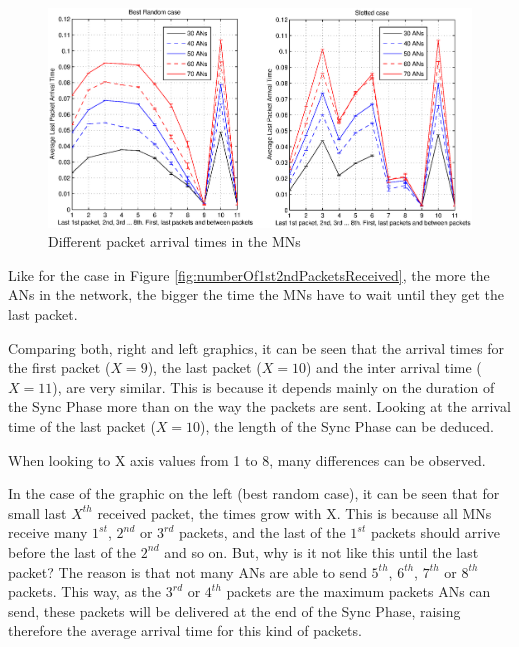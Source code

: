 \begin{figure}[ht]
 \begin{center}
  \includegraphics[width=1\textwidth]{Lastarrivalpackettimes.eps}
 \end{center}
 \caption{Different packet arrival times in the \acp{MN}}
 \label{fig:Lastarrivalpackettimes}
\end{figure}

Like for the case in Figure \ref{fig:numberOf1st2ndPacketsReceived}, the more the \acp{AN} in the network, the bigger the time the \acp{MN} have to wait 
until they get the last packet.

Comparing both, right and left graphics, it can be seen that the arrival times for the first packet ($X=9$), the last packet ($X=10$) and the inter arrival 
time ($X=11$), are very similar. This is because it depends mainly on the duration of the Sync Phase more than on the way the packets are sent. 
Looking at the arrival time of the last packet ($X=10$), the length of the Sync Phase can be deduced.

When looking to X axis values from 1 to 8, many differences can be observed.

In the case of the graphic on the left (best random case), it can be seen that for small last $X^{th}$ received packet, the times grow with X. 
This is because all \acp{MN} receive many $1^{st}$, $2^{nd}$ or $3^{rd}$ packets, and the last of the $1^{st}$ packets should arrive 
before the last of the $2^{nd}$ and so on. But, why is it not like this until the last packet? The reason is that not many \acp{AN} are able to send
$5^{th}$, $6^{th}$, $7^{th}$ or $8^{th}$ packets. This way, as the $3^{rd}$ or $4^{th}$ packets are the maximum packets \acp{AN} can send, 
these packets will be delivered at the end of the Sync Phase, raising therefore the average arrival time for this kind of packets.

